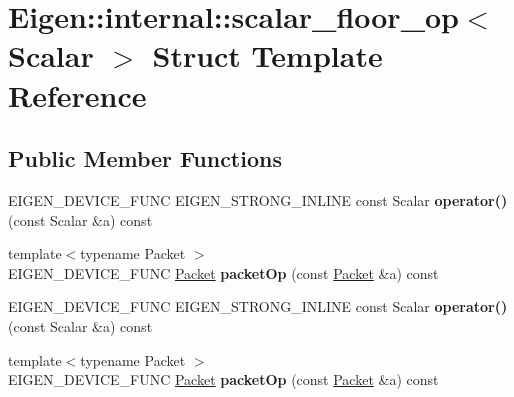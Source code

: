 \hypertarget{struct_eigen_1_1internal_1_1scalar__floor__op}{}\section{Eigen\+:\+:internal\+:\+:scalar\+\_\+floor\+\_\+op$<$ Scalar $>$ Struct Template Reference}
\label{struct_eigen_1_1internal_1_1scalar__floor__op}
\subsection*{Public Member Functions}
\begin{DoxyCompactItemize}
\item 
\mbox{\label{struct_eigen_1_1internal_1_1scalar__floor__op_abb81dcb4a8d662bfd7a03b065d16adca}} 
E\+I\+G\+E\+N\+\_\+\+D\+E\+V\+I\+C\+E\+\_\+\+F\+U\+NC E\+I\+G\+E\+N\+\_\+\+S\+T\+R\+O\+N\+G\+\_\+\+I\+N\+L\+I\+NE const Scalar {\bfseries operator()} (const Scalar \&a) const
\item 
\mbox{\label{struct_eigen_1_1internal_1_1scalar__floor__op_a3ae0504ec80ce06db5d3505aa115bb27}} 
{\footnotesize template$<$typename Packet $>$ }\\E\+I\+G\+E\+N\+\_\+\+D\+E\+V\+I\+C\+E\+\_\+\+F\+U\+NC \hyperlink{union_eigen_1_1internal_1_1_packet}{Packet} {\bfseries packet\+Op} (const \hyperlink{union_eigen_1_1internal_1_1_packet}{Packet} \&a) const
\item 
\mbox{\label{struct_eigen_1_1internal_1_1scalar__floor__op_abb81dcb4a8d662bfd7a03b065d16adca}} 
E\+I\+G\+E\+N\+\_\+\+D\+E\+V\+I\+C\+E\+\_\+\+F\+U\+NC E\+I\+G\+E\+N\+\_\+\+S\+T\+R\+O\+N\+G\+\_\+\+I\+N\+L\+I\+NE const Scalar {\bfseries operator()} (const Scalar \&a) const
\item 
\mbox{\label{struct_eigen_1_1internal_1_1scalar__floor__op_a3ae0504ec80ce06db5d3505aa115bb27}} 
{\footnotesize template$<$typename Packet $>$ }\\E\+I\+G\+E\+N\+\_\+\+D\+E\+V\+I\+C\+E\+\_\+\+F\+U\+NC \hyperlink{union_eigen_1_1internal_1_1_packet}{Packet} {\bfseries packet\+Op} (const \hyperlink{union_eigen_1_1internal_1_1_packet}{Packet} \&a) const
\end{DoxyCompactItemize}


